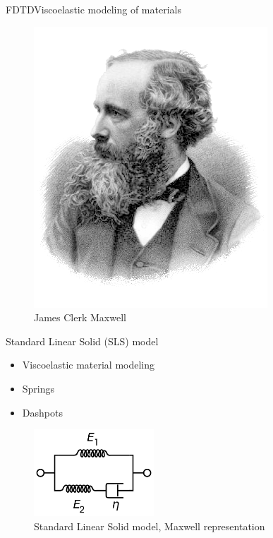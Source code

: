 \documentclass[9pt, xcolor={usenames, dvipsnames}]{beamer}
\begin{document}
				\begin{frame}{FDTD}{Viscoelastic modeling of materials}
					\centering
					\begin{minipage}[c]{0.3\textwidth}
						\begin{figure}
							\includegraphics[width=\textwidth]{images/profile/James_Clerk_Maxwell.png}
							\caption{James Clerk Maxwell}
						\end{figure}
					\end{minipage}
					\hfill
					\begin{minipage}[c]{0.6\textwidth}
						\begin{block}{Standard Linear Solid (SLS) model}
							\begin{itemize}
								\item Viscoelastic material modeling 
								\item Springs
								\item Dashpots
							\end{itemize}
						\end{block}
						\begin{figure}
							\includegraphics[width=0.4\textwidth]{images/SLS.png}
							\caption{Standard Linear Solid model, Maxwell representation}
						\end{figure}
					\end{minipage}
				\end{frame}
\end{document}
